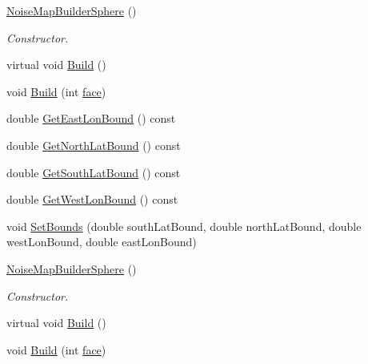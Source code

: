 \begin{DoxyCompactItemize}
\item 
\hyperlink{classnoise_1_1utils_1_1_noise_map_builder_sphere_ad18bcd94de3b6e9a68c40fbfb0349dfe}{Noise\+Map\+Builder\+Sphere} ()
\begin{DoxyCompactList}\small\item\em Constructor. \end{DoxyCompactList}\item 
virtual void \hyperlink{classnoise_1_1utils_1_1_noise_map_builder_sphere_a39ac9c3dba8db40b6d5d34c2ec54704b}{Build} ()
\item 
void \hyperlink{classnoise_1_1utils_1_1_noise_map_builder_sphere_afe9540eaca869ad246945aa378b7aa5d}{Build} (int \hyperlink{_planet_8cpp_ae1161f79bdbe47164b23549af2139d25}{face})
\item 
double \hyperlink{classnoise_1_1utils_1_1_noise_map_builder_sphere_a147b825ed70509ae4915cf58dcbc5849}{Get\+East\+Lon\+Bound} () const 
\item 
double \hyperlink{classnoise_1_1utils_1_1_noise_map_builder_sphere_a3a57e009f39f48a464ea0edc2beb4241}{Get\+North\+Lat\+Bound} () const 
\item 
double \hyperlink{classnoise_1_1utils_1_1_noise_map_builder_sphere_a8a4c78a1a4d6b659e721fabdf3f5f47f}{Get\+South\+Lat\+Bound} () const 
\item 
double \hyperlink{classnoise_1_1utils_1_1_noise_map_builder_sphere_aef51b39b7fbd0a010e17e47bff877ae1}{Get\+West\+Lon\+Bound} () const 
\item 
void \hyperlink{classnoise_1_1utils_1_1_noise_map_builder_sphere_ad2f19622ba12bc8ee715b2d070bfaf09}{Set\+Bounds} (double south\+Lat\+Bound, double north\+Lat\+Bound, double west\+Lon\+Bound, double east\+Lon\+Bound)
\item 
\hyperlink{classnoise_1_1utils_1_1_noise_map_builder_sphere_af11f66fdc2c0c68624bc18108548ada7}{Noise\+Map\+Builder\+Sphere} ()
\begin{DoxyCompactList}\small\item\em Constructor. \end{DoxyCompactList}\item 
virtual void \hyperlink{classnoise_1_1utils_1_1_noise_map_builder_sphere_a3596d6c68110cfaa10b6624a5670db70}{Build} ()
\item 
void \hyperlink{classnoise_1_1utils_1_1_noise_map_builder_sphere_a5de6eff940f65bcca84683058641f0fd}{Build} (int \hyperlink{_planet_8cpp_ae1161f79bdbe47164b23549af2139d25}{face})
\item 

\end{DoxyCompactItemize}
